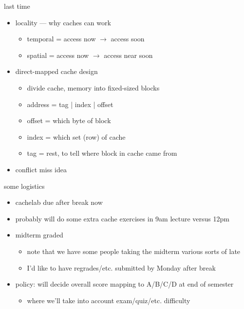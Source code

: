 \date{}
\title{}
\date{}

\begin{frame}
    \titlepage
\end{frame}





\begin{frame}{last time}
    \begin{itemize}
    \item locality --- why caches can work
        \begin{itemize}
        \item temporal = access now $\rightarrow$ access soon
        \item spatial = access now $\rightarrow$ access near soon
        \end{itemize}
    \item direct-mapped cache design
        \begin{itemize}
        \item divide cache, memory into fixed-sized blocks
        \item address = tag | index | offset
        \item offset = which byte of block
        \item index = which set (row) of cache
        \item tag = rest, to tell where block in cache came from
        \end{itemize}
    \item conflict miss idea
    \end{itemize}
\end{frame}

\begin{frame}{some logistics}
    \begin{itemize}
    \item cachelab due after break now 
    \item probably will do some extra cache exercises in 9am lecture versus 12pm
    \vspace{.5cm}
    \item midterm graded
        \begin{itemize}
        \item note that we have some people taking the midterm various sorts of late
        \item I'd like to have regrades/etc. submitted by Monday after break
        \end{itemize}
    \item policy: will decide overall score mapping to A/B/C/D at end of semester
        \begin{itemize}
        \item where we'll take into account exam/quiz/etc. difficulty
        \end{itemize}
    \end{itemize}
\end{frame}

